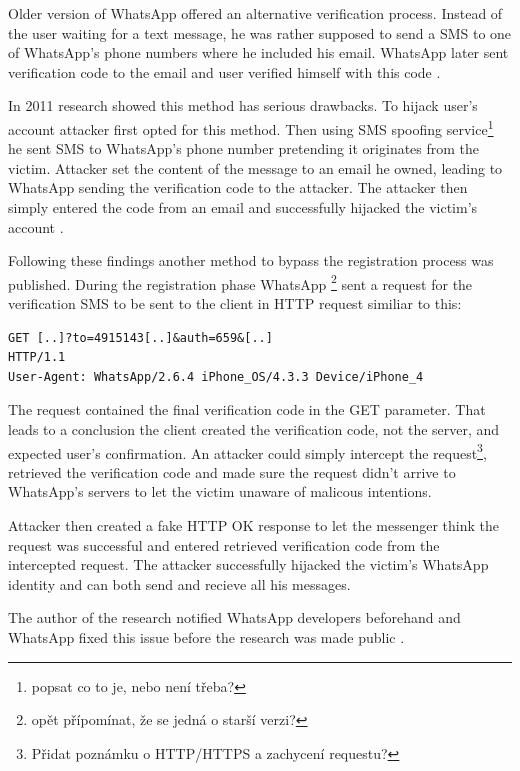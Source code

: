 \documentclass[thesis=M,english]{FITthesis}[2012/10/20]
\begin{document}
Older version of WhatsApp offered an alternative verification process. Instead of the user waiting for a text message, he was rather supposed to send a SMS to one of WhatsApp's phone numbers where he included his email. WhatsApp later sent verification code to the email and user verified himself with this code \cite{whatsapp-shootingthemsg}.

In 2011 research showed this method has serious drawbacks. To hijack user's account attacker first opted for this method. Then using SMS spoofing service\footnote{popsat co to je, nebo není třeba?} he sent SMS to WhatsApp's phone number pretending it originates from the victim. Attacker set the content of the message to an email he owned, leading to WhatsApp sending the verification code to the attacker. The attacker then simply entered the code from an email and successfully hijacked the victim's account \cite{whatsapp-hijack1}.

Following these findings another method to bypass the registration process was published. During the registration phase WhatsApp \footnote{opět přípomínat, že se jedná o starší verzi?} sent a request for the verification SMS to be sent to the client in HTTP request similiar to this: \cite{whatsapp-shootingthemsg}


\begin{lstlisting}[caption={HTTP request to dispatch SMS}]
GET [..]?to=4915143[..]&auth=659&[..]
HTTP/1.1
User-Agent: WhatsApp/2.6.4 iPhone_OS/4.3.3 Device/iPhone_4
\end{lstlisting}

The request contained the final verification code in the GET parameter. That leads to a conclusion the client created the verification code, not the server, and expected user's confirmation. An attacker could simply intercept the request\footnote{Přidat poznámku o HTTP/HTTPS a zachycení requestu?}, retrieved the verification code and made sure the request didn't arrive to WhatsApp's servers to let the victim unaware of malicous intentions.

Attacker then created a fake HTTP OK response to let the messenger think the request was successful and entered retrieved verification code from the intercepted request. The attacker successfully hijacked the victim's WhatsApp identity and can both send and recieve all his messages.


The author of the research notified WhatsApp developers beforehand and WhatsApp fixed this issue before the research was made public \cite{whatsapp-shootingthemsg}.
\end{document}
